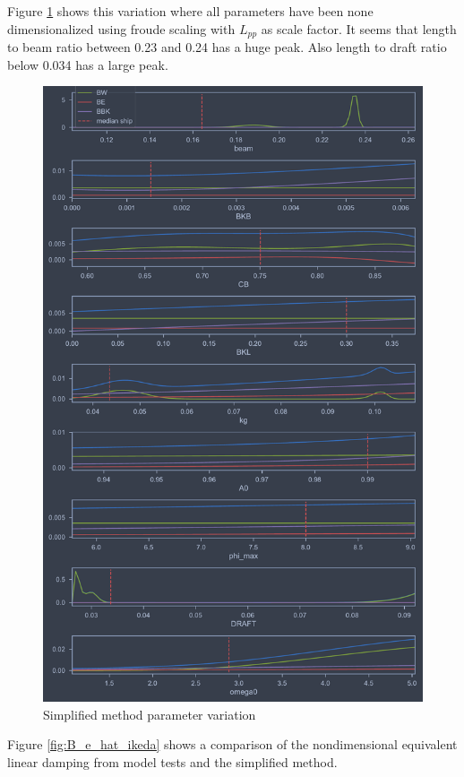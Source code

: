Figure \ref{fig:ikeda_variation} shows this variation where all parameters have been none dimensionalized using froude scaling with $L_{pp}$ as scale factor. 
It seems that length to beam ratio between 0.23 and 0.24 has a huge peak. Also length to draft ratio below 0.034 has a large peak. 

\begin{figure}[H]
    \centering
    \includegraphics[width=0.9\columnwidth]{figures/ikeda_variation.pdf}
    \caption{Simplified method parameter variation}
    \label{fig:ikeda_variation}
\end{figure}

Figure \ref{fig:B_e_hat_ikeda} shows a comparison of the nondimensional equivalent linear damping from model tests and the simplified method.  

